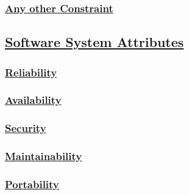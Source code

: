	\subsubsection[Any other Constraint]{\hyperlink{toc}{Any other Constraint}}

\subsection[Software System Attributes]{\hyperlink{toc}{Software System Attributes}}
	\subsubsection[Reliability]{\hyperlink{toc}{Reliability}}
	\subsubsection[Availability]{\hyperlink{toc}{Availability}}
	\subsubsection[Security]{\hyperlink{toc}{Security}}
	\subsubsection[Maintainability]{\hyperlink{toc}{Maintainability}}
	\subsubsection[Portability]{\hyperlink{toc}{Portability}}
